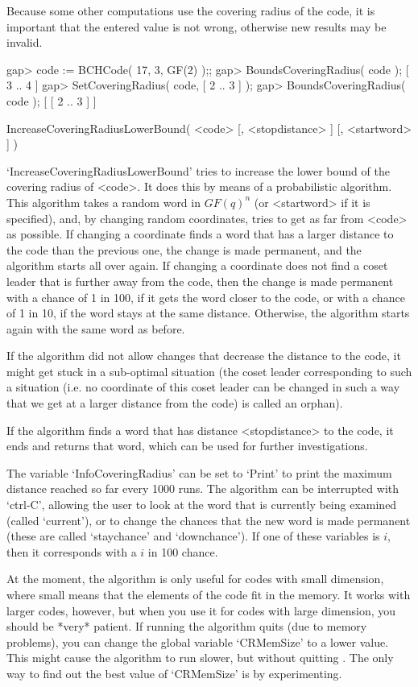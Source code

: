 Because some other computations use the covering radius of the code,
it is important that the entered value is not wrong, otherwise
new results may be invalid.

\beginexample
gap> code := BCHCode( 17, 3, GF(2) );;
gap> BoundsCoveringRadius( code );
[ 3 .. 4 ]
gap> SetCoveringRadius( code, [ 2 .. 3 ] );
gap> BoundsCoveringRadius( code );
[ [ 2 .. 3 ] ]
\endexample

\>IncreaseCoveringRadiusLowerBound( <code> [, <stopdistance> ] [, <startword> ] )

`IncreaseCoveringRadiusLowerBound' tries to increase the lower  bound  of
the covering radius of <code>. It does this by means of  a  probabilistic
algorithm.  This  algorithm  takes  a  random  word  in   $GF(q)^n$   (or
<startword> if it is specified), and,  by  changing  random  coordinates,
tries to get as far from <code> as possible.  If  changing  a  coordinate
finds a word that has a larger distance to the  code  than  the  previous
one, the change is made permanent, and  the  algorithm  starts  all  over
again. If changing a coordinate does not find  a  coset  leader  that  is
further away from the code, then the change  is  made  permanent  with  a
chance of 1 in 100, if it gets the word closer to the  code,  or  with  a
chance of 1 in 10, if the word stays at the same distance. Otherwise, the
algorithm starts again with the same word as before.

If the algorithm did not allow changes that decrease the distance to  the
code, it might get stuck in a sub-optimal  situation  (the  coset  leader
corresponding to such a situation  (i.e.  no  coordinate  of  this  coset
leader can be changed in such a way that we get at a larger distance from
the code) is called an orphan).

If the algorithm finds a word that has  distance  <stopdistance>  to  the
code, it ends and returns that  word,  which  can  be  used  for  further
investigations.

The variable `InfoCoveringRadius' can be set  to  `Print'  to  print  the
maximum distance reached so far every 1000 runs.  The  algorithm  can  be
interrupted with `ctrl-C', allowing the user to look at the word that  is
currently being examined (called `current'), or  to  change  the  chances
that the new word is made permanent (these are  called  `staychance'  and
`downchance'). If one of these variables is $i$, then it corresponds with
a $i$ in 100 chance.

At the moment,  the  algorithm  is  only  useful  for  codes  with  small
dimension, where small means that the elements of the  code  fit  in  the
memory. It works with larger codes, however, but  when  you  use  it  for
codes with large dimension, you should be *very* patient. If running  the
algorithm quits {\GAP} (due to  memory  problems),  you  can  change  the
global variable `CRMemSize' to  a  lower  value.  This  might  cause  the
algorithm to run slower, but without quitting {\GAP}.  The  only  way  to
find out the best value of `CRMemSize' is by experimenting.

